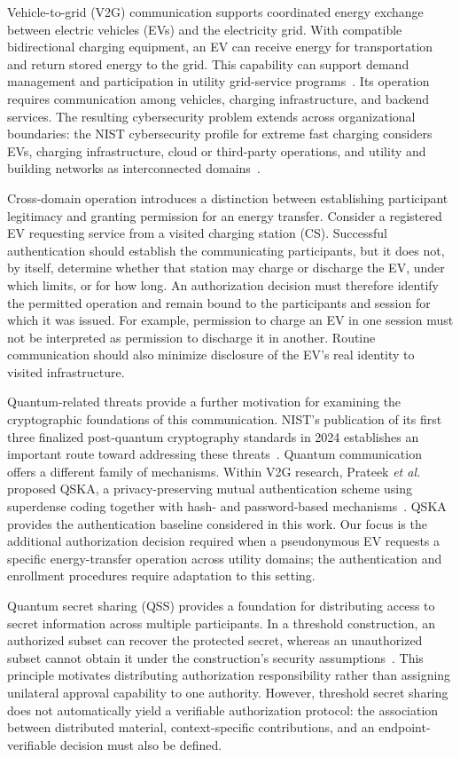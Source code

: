 \documentclass[twocolumn,10pt,journal]{IEEEtran}
\begin{document}
Vehicle-to-grid (V2G) communication supports coordinated energy exchange between electric vehicles (EVs) and the electricity grid. With compatible bidirectional charging equipment, an EV can receive energy for transportation and return stored energy to the grid. This capability can support demand management and participation in utility grid-service programs~\cite{doe_bidirectional}. Its operation requires communication among vehicles, charging infrastructure, and backend services. The resulting cybersecurity problem extends across organizational boundaries: the NIST cybersecurity profile for extreme fast charging considers EVs, charging infrastructure, cloud or third-party operations, and utility and building networks as interconnected domains~\cite{nist_ir8473}.

Cross-domain operation introduces a distinction between establishing participant legitimacy and granting permission for an energy transfer. Consider a registered EV requesting service from a visited charging station (CS). Successful authentication should establish the communicating participants, but it does not, by itself, determine whether that station may charge or discharge the EV, under which limits, or for how long. An authorization decision must therefore identify the permitted operation and remain bound to the participants and session for which it was issued. For example, permission to charge an EV in one session must not be interpreted as permission to discharge it in another. Routine communication should also minimize disclosure of the EV's real identity to visited infrastructure.

Quantum-related threats provide a further motivation for examining the cryptographic foundations of this communication. NIST's publication of its first three finalized post-quantum cryptography standards in 2024 establishes an important route toward addressing these threats~\cite{nist_pqc2024}. Quantum communication offers a different family of mechanisms. Within V2G research, Prateek \emph{et al.} proposed QSKA, a privacy-preserving mutual authentication scheme using superdense coding together with hash- and password-based mechanisms~\cite{prateek2024qska}. QSKA provides the authentication baseline considered in this work. Our focus is the additional authorization decision required when a pseudonymous EV requests a specific energy-transfer operation across utility domains; the authentication and enrollment procedures require adaptation to this setting.

Quantum secret sharing (QSS) provides a foundation for distributing access to secret information across multiple participants. In a threshold construction, an authorized subset can recover the protected secret, whereas an unauthorized subset cannot obtain it under the construction's security assumptions~\cite{cleve1999quantum}. This principle motivates distributing authorization responsibility rather than assigning unilateral approval capability to one authority. However, threshold secret sharing does not automatically yield a verifiable authorization protocol: the association between distributed material, context-specific contributions, and an endpoint-verifiable decision must also be defined.
\end{document}
